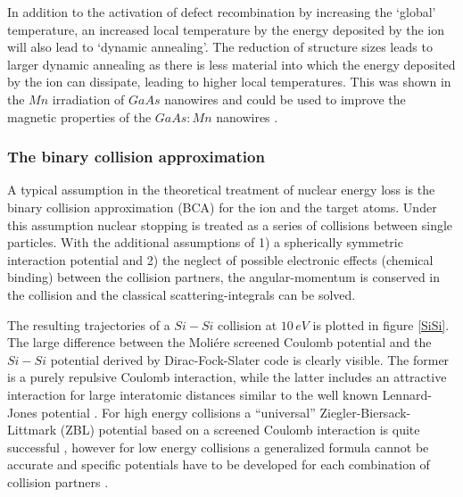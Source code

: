 In addition to the activation of defect recombination by increasing the `global' temperature, an increased local temperature by the energy deposited by the ion will also lead to `dynamic annealing'. The reduction of structure sizes leads to larger dynamic annealing as there is less material into which the energy deposited by the ion can dissipate, leading to higher local temperatures. This was shown in the $Mn$ irradiation of $GaAs$ nanowires \cite{borschel_ion-solid_2012,johannes_ion_2015} and could be used to improve the magnetic properties of the $GaAs:Mn$ nanowires \cite{borschel_new_2011,paschoal_hopping_2012,kumar_magnetic_2013,paschoal_magnetoresistance_2014}. 


\subsubsection{The binary collision approximation}

A typical assumption in the theoretical treatment of nuclear energy loss is the binary collision approximation (BCA) for the ion and the target atoms. Under this assumption nuclear stopping is treated as a series of collisions between single particles. With the additional assumptions of 1) a spherically symmetric interaction potential and 2) the neglect of possible electronic effects (chemical binding) between the collision partners, the angular-momentum is conserved in the collision and the classical scattering-integrals can be solved. 

The resulting trajectories of a $Si-Si$ collision at $10\,eV$ is plotted in figure \ref{SiSi}. The large difference between the Moliére screened Coulomb potential and the $Si-Si$ potential derived by Dirac-Fock-Slater code is clearly visible. The former is a purely repulsive Coulomb interaction, while the latter includes an attractive interaction for large interatomic distances similar to the well known Lennard-Jones potential \cite{eckstein_computer_1991}. For high energy collisions a ``universal'' Ziegler-Biersack-Littmark (ZBL) potential based on a screened Coulomb interaction is quite successful \cite{ziegler_stopping_1985}, however for low energy collisions a generalized formula cannot be accurate and specific potentials have to be developed for each combination of collision partners \cite{dedkov_interatomic_1995,nordlund_repulsive_1997,albe_modeling_2002,nordlund_interatomic_2008}.

